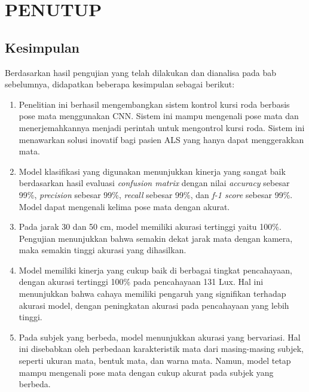 \chapter{PENUTUP}
\label{chap:penutup}


\section{Kesimpulan}
\label{sec:kesimpulan}

Berdasarkan hasil pengujian yang telah dilakukan dan dianalisa pada bab sebelumnya, didapatkan beberapa kesimpulan sebagai berikut:

\begin{enumerate}[nolistsep]

  \item Penelitian ini berhasil mengembangkan sistem kontrol kursi roda berbasis pose mata menggunakan CNN. Sistem ini mampu mengenali pose mata dan menerjemahkannya menjadi perintah untuk mengontrol kursi roda. Sistem ini menawarkan solusi inovatif bagi pasien ALS yang hanya dapat menggerakkan mata.

  \item Model klasifikasi yang digunakan menunjukkan kinerja yang sangat baik berdasarkan hasil evaluasi \emph{confusion matrix} dengan nilai \emph{accuracy} sebesar 99\%, \emph{precision} sebesar 99\%, \emph{recall} sebesar 99\%, dan \emph{f-1 score} sebesar 99\%. Model dapat mengenali kelima pose mata dengan akurat.

  \item Pada jarak 30 dan 50 cm, model memiliki akurasi tertinggi yaitu 100\%. Pengujian menunjukkan bahwa semakin dekat jarak mata dengan kamera, maka semakin tinggi akurasi yang dihasilkan.
  
  \item Model memiliki kinerja yang cukup baik di berbagai tingkat pencahayaan, dengan akurasi tertinggi 100\% pada pencahayaan 131 Lux. Hal ini menunjukkan bahwa cahaya memiliki pengaruh yang signifikan terhadap akurasi model, dengan peningkatan akurasi pada pencahayaan yang lebih tinggi.
  
  \item Pada subjek yang berbeda, model menunjukkan akurasi yang bervariasi. Hal ini disebabkan oleh perbedaan karakteristik mata dari masing-masing subjek, seperti ukuran mata, bentuk mata, dan warna mata. Namun, model tetap mampu mengenali pose mata dengan cukup akurat pada subjek yang berbeda.


\end{enumerate}
